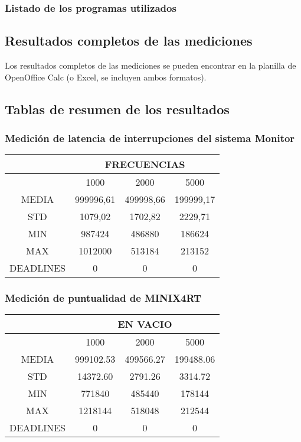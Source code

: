 \subsubsection{Listado de los programas utilizados}


\subsection{Resultados completos de las mediciones}
Los resultados completos de las mediciones se pueden encontrar en la planilla
de OpenOffice Calc (o Excel, se incluyen ambos formatos).


\subsection{Tablas de resumen de los resultados}

\subsubsection{Medición de latencia de interrupciones del sistema Monitor}
\begin{center}
\begin{tabular}{|c|c|c|c|}
\hline
&\multicolumn{3}{|c|}{FRECUENCIAS}\\
\hline
&1000&2000&5000\\
\hline
MEDIA&999996,61&499998,66&199999,17\\
\hline
STD&1079,02&1702,82&2229,71\\
\hline
MIN&987424&486880&186624\\
\hline
MAX&1012000&513184&213152\\
\hline
DEADLINES&0&0&0\\
\hline
\end{tabular}
\end{center}


\subsubsection{Medición de puntualidad de MINIX4RT}

\begin{center}
\begin{tabular}{|c|c|c|c|}
\hline
&\multicolumn{3}{|c|}{EN VACIO}\\
\hline
&1000&2000&5000\\
\hline
MEDIA&999102.53&499566.27&199488.06\\
\hline
STD&14372.60&2791.26&3314.72\\
\hline
MIN&771840&485440&178144\\
\hline
MAX&1218144&518048&212544\\
\hline
DEADLINES&0&0&0\\
\hline
\end{tabular}
\end{center}

